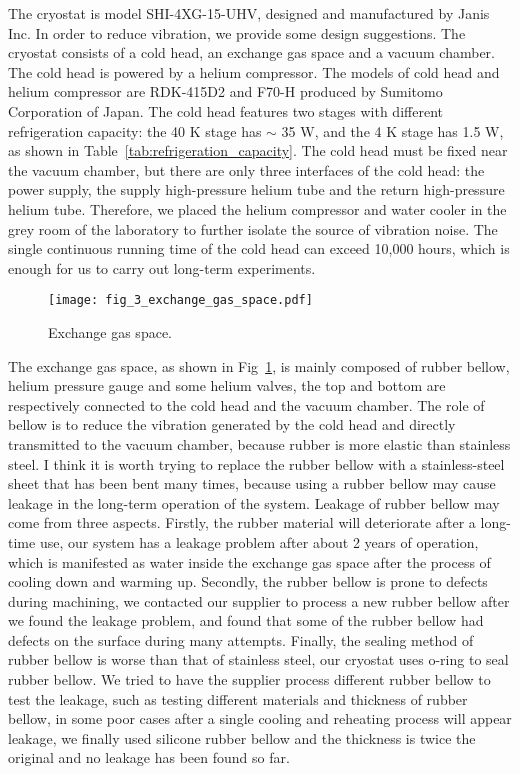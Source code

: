 The cryostat is model SHI-4XG-15-UHV, designed and manufactured by Janis Inc. In order to reduce vibration, we provide some design suggestions. The cryostat consists of a cold head, an exchange gas space and a vacuum chamber.
The cold head is powered by a helium compressor. The models of cold head and helium compressor are RDK-415D2 and F70-H produced by Sumitomo Corporation of Japan. The cold head features two stages with different refrigeration capacity: the 40 K stage has $\sim$ 35 W, and the 4 K stage has 1.5 W, as shown in Table~\ref{tab:refrigeration_capacity}. The cold head must be fixed near the vacuum chamber, but there are only three interfaces of the cold head: the power supply, the supply high-pressure helium tube and the return high-pressure helium tube. Therefore, we placed the helium compressor and water cooler in the grey room of the laboratory to further isolate the source of vibration noise. The single continuous running time of the cold head can exceed 10,000 hours, which is enough for us to carry out long-term experiments.

\begin{figure}
    \centering
    \texttt{[image: fig\_3\_exchange\_gas\_space.pdf]}
    \caption{Exchange gas space.}
    \label{fig:exchange_gas_space}
\end{figure}

The exchange gas space, as shown in Fig~\ref{fig:exchange_gas_space}, is mainly composed of rubber bellow, helium pressure gauge and some helium valves, the top and bottom are respectively connected to the cold head and the vacuum chamber. The role of bellow is to reduce the vibration generated by the cold head and directly transmitted to the vacuum chamber, because rubber is more elastic than stainless steel. I think it is worth trying to replace the rubber bellow with a stainless-steel sheet that has been bent many times, because using a rubber bellow may cause leakage in the long-term operation of the system. Leakage of rubber bellow may come from three aspects. Firstly, the rubber material will deteriorate after a long-time use, our system has a leakage problem after about 2 years of operation, which is manifested as water inside the exchange gas space after the process of cooling down and warming up. Secondly, the rubber bellow is prone to defects during machining, we contacted our supplier to process a new rubber bellow after we found the leakage problem, and found that some of the rubber bellow had defects on the surface during many attempts. Finally, the sealing method of rubber bellow is worse than that of stainless steel, our cryostat uses o-ring to seal rubber bellow. We tried to have the supplier process different rubber bellow to test the leakage, such as testing different materials and thickness of rubber bellow, in some poor cases after a single cooling and reheating process will appear leakage, we finally used silicone rubber bellow and the thickness is twice the original and no leakage has been found so far.



